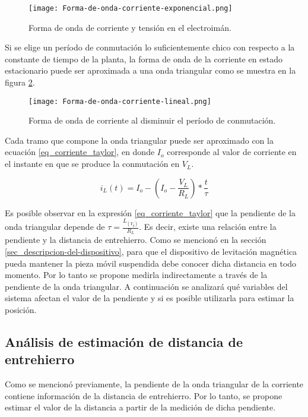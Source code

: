 \begin{figure}[H]
	\centering
	\texttt{[image: Forma-de-onda-corriente-exponencial.png]}
	\caption{Forma de onda de corriente y tensión en el electroimán.}
	\label{fig:img_corriente_exponencial}
\end{figure}

Si se elige un período de conmutación lo suficientemente chico con respecto a la constante de tiempo de la planta, la forma de onda de la corriente en estado estacionario puede ser aproximada a una onda triangular como se muestra en la figura \ref{fig:img_corriente_lineal}. 

\begin{figure}[H]
	\centering
	\texttt{[image: Forma-de-onda-corriente-lineal.png]}
	\caption{Forma de onda de corriente al disminuir el período de conmutación.}
	\label{fig:img_corriente_lineal}
\end{figure}

Cada tramo que compone la onda triangular puede ser aproximado con la ecuación \ref{eq_corriente_taylor}, en donde $I_o$ corresponde al valor de corriente en el instante en que se produce la conmutación en $V_L$.

\begin{equation} \label{eq_corriente_taylor}
	i_L(t)=I_o -  (I_o-\frac{V_L}{R_L})*\frac{t}{\tau}
\end{equation}

Es posible observar en la expresión \ref{eq_corriente_taylor} que la pendiente de la onda triangular depende de $\tau=\frac{L_{(Y_g)}}{R_L}$. Es decir, existe una relación entre la pendiente y la distancia de entrehierro. Como se mencionó en la sección \ref{sec_descripcion-del-dispositivo}, para que el dispositivo de levitación magnética pueda mantener la pieza móvil suspendida debe conocer dicha distancia en todo momento. Por lo tanto se propone medirla indirectamente a través de la pendiente de la onda triangular. A continuación se analizará qué variables del sistema afectan el valor de la pendiente y si es posible utilizarla para estimar la posición.

\subsection{Análisis de estimación de distancia de entrehierro} \label{sec_analisis_estimacion}

Como se mencionó previamente, la pendiente de la onda triangular de la corriente contiene información de la distancia de entrehierro. Por lo tanto, se propone estimar el valor de la distancia a partir de la medición de dicha pendiente. 

